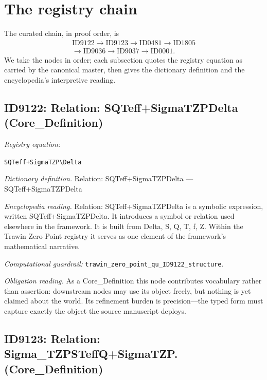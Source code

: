 \documentclass[11pt]{article}
\theoremstyle{remark}
\begin{document}
\section{The registry chain}
\label{sec:chain}

The curated chain, in proof order, is
\begin{equation*}
\begin{gathered}
\text{ID9122} \to \text{ID9123} \to \text{ID0481} \to \text{ID1805} \\
\to \text{ID9036} \to \text{ID9037} \to \text{ID0001}.
\end{gathered}
\end{equation*}
We take the nodes in order; each subsection quotes the registry equation as carried by the canonical master, then gives the dictionary definition and the encyclopedia's interpretive reading.

\subsection{ID9122: Relation: SQTeff+SigmaTZPDelta (Core\_Definition)}

\noindent\textit{Registry equation:}\par
{\small\texttt{SQTeff+SigmaTZP\textbackslash{}Delta}}\par\medskip
\noindent\textit{Dictionary definition.} Relation: SQTeff+SigmaTZPDelta --- SQTeff+SigmaTZPDelta\par\medskip
\noindent\textit{Encyclopedia reading.} Relation: SQTeff+SigmaTZPDelta is a symbolic expression, written SQTeff+SigmaTZPDelta. It introduces a symbol or relation used elsewhere in the framework. It is built from Delta, S, Q, T, f, Z. Within the Trawin Zero Point registry it serves as one element of the framework's mathematical narrative.
\par\medskip\noindent\textit{Computational guardrail:} \texttt{trawin\_zero\_point\_qu\_ID9122\_structure}.
\par\medskip\noindent\textit{Obligation reading.} As a Core\_Definition this node contributes vocabulary rather than assertion: downstream nodes may use its object freely, but nothing is yet claimed about the world. Its refinement burden is precision---the typed form must capture exactly the object the source manuscript deploys.

\subsection{ID9123: Relation: Sigma\_TZPSTeffQ+SigmaTZP. (Core\_Definition)}
\end{document}
